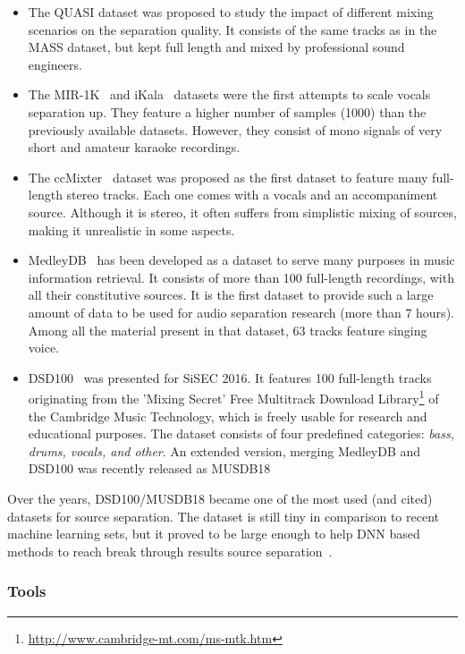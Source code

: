 \begin{itemize}[leftmargin=*]
	\item The QUASI dataset was proposed to study the impact of different mixing scenarios on the separation quality. It  consists of the same tracks as in the MASS dataset, but kept full length and mixed by professional sound engineers.
	\item The MIR-1K~\cite{hsu10} and iKala~\cite{chan15} datasets were the first attempts to scale vocals separation up. They feature a higher number of samples (1000) than the previously available datasets. However, they consist of mono signals of very short and amateur karaoke recordings.
	\item The ccMixter~\cite{liutkus142} dataset was proposed as the first dataset to feature many full-length stereo tracks. Each one comes with a vocals and an accompaniment source. Although it is stereo, it often suffers from simplistic mixing of sources, making it unrealistic in some aspects.
	\item MedleyDB~\cite{bittner14} has been developed as a dataset to serve many purposes in music information retrieval. It consists of more than 100 full-length recordings, with all their constitutive sources. It is the first dataset to provide such a large amount of data to be used for audio separation research (more than 7 hours). Among all the material present in that dataset, 63 tracks feature singing voice.
	\item DSD100~\cite{liutkus17} was presented for SiSEC 2016. It features 100 full-length tracks originating from the 'Mixing Secret' Free Multitrack Download Library\footnote{\url{http://www.cambridge-mt.com/ms-mtk.htm}} of the Cambridge Music Technology, which is freely usable for research and educational purposes.
	The dataset consists of four predefined categories: \emph{bass, drums, vocals, and other}. An extended version, merging MedleyDB and DSD100 was recently released as MUSDB18~\cite{rafii17, stoeter18sisec}
\end{itemize}

Over the years, DSD100/MUSDB18 became one of the most used (and cited) datasets for source separation. 
The dataset is still tiny in comparison to recent machine learning sets, but it proved to be large enough to help DNN based methods to reach break through results source separation~\cite{stoeter18sisec}.

\subsubsection*{Tools}


